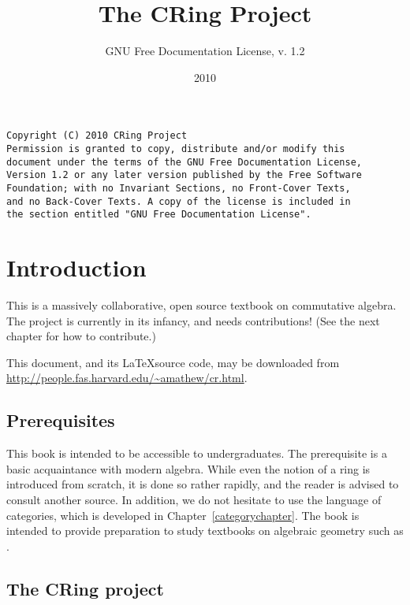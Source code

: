 
\nocite{*}

\title{The CRing Project}
\author{GNU Free Documentation License, v. 1.2}
\date{2010}

\maketitle
\begin{verbatim}
Copyright (C) 2010 CRing Project 
Permission is granted to copy, distribute and/or modify this
document under the terms of the GNU Free Documentation License,
Version 1.2 or any later version published by the Free Software
Foundation; with no Invariant Sections, no Front-Cover Texts,
and no Back-Cover Texts. A copy of the license is included in
the section entitled "GNU Free Documentation License". \end{verbatim}


\fancyhead{}
\fancyfoot{}
\tableofcontents

\newpage 


\pagestyle{fancy}



\chapter*{Introduction}

This  is a massively collaborative, open source textbook on
commutative algebra. The project is currently in its infancy, and needs
contributions! (See the next chapter for how to contribute.)

This document, and
its \LaTeX source code, may be downloaded from
\url{http://people.fas.harvard.edu/~amathew/cr.html}.

\section*{Prerequisites}
This book is intended to be accessible to undergraduates. The prerequisite  is a basic acquaintance with modern
algebra. While even the notion of a ring is introduced from scratch, it is
done so rather rapidly, and the reader is advised to consult another source.
In addition, we do not hesitate to use the language of categories,
which is developed in Chapter~\ref{categorychapter}. The book is intended to
provide preparation to study textbooks on algebraic geometry such as
\cite{Ha77}.

\section*{The CRing project}

